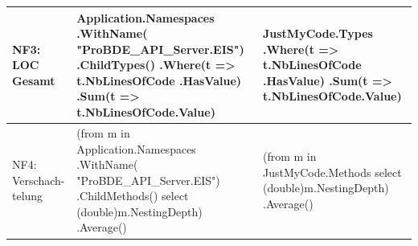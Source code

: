 \begin{longtable}{|>{\raggedright\arraybackslash}p{}|>{\raggedright\arraybackslash}p{}|>{\raggedright\arraybackslash}p{}|}
NF3: LOC Gesamt &
{\ttfamily
Application.Namespaces\newline
\quad .WithName(\newline
\quad \quad "ProBDE\_API\_Server.EIS")\newline
\quad .ChildTypes()\newline
\quad .Where(t => t.NbLinesOfCode\newline
\quad \quad .HasValue)\newline
\quad .Sum(t => t.NbLinesOfCode.Value)
}
&
{\ttfamily
JustMyCode.Types\newline
\quad .Where(t => t.NbLinesOfCode\newline
\quad \quad .HasValue)\newline
\quad .Sum(t => t.NbLinesOfCode.Value)
}
\\ \hline

NF4: Verschach-telung &
{\ttfamily
(from m in Application.Namespaces\newline
\quad .WithName(\newline
\quad \quad "ProBDE\_API\_Server.EIS")\newline
\quad .ChildMethods()\newline
select (double)m.NestingDepth)\newline
\quad .Average()
}
&
{\ttfamily
(from m in JustMyCode.Methods\newline
select (double)m.NestingDepth)\newline
\quad .Average()
}
\\ \hline


\end{longtable}
